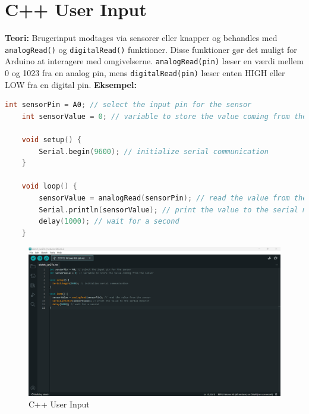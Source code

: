 \section{C++ User Input}
\textbf{Teori:} Brugerinput modtages via sensorer eller knapper og behandles med \texttt{analogRead()} og \texttt{digitalRead()} funktioner. Disse funktioner gør det muligt for Arduino at interagere med omgivelserne. \texttt{analogRead(pin)} læser en værdi mellem 0 og 1023 fra en analog pin, mens \texttt{digitalRead(pin)} læser enten HIGH eller LOW fra en digital pin.
\newline\newline
\noindent\textbf{Eksempel:}
\begin{lstlisting}[language=C++]
	int sensorPin = A0; // select the input pin for the sensor
	int sensorValue = 0; // variable to store the value coming from the sensor
	
	void setup() {
		Serial.begin(9600); // initialize serial communication
	}
	
	void loop() {
		sensorValue = analogRead(sensorPin); // read the value from the sensor
		Serial.println(sensorValue); // print the value to the serial monitor
		delay(1000); // wait for a second
	}
\end{lstlisting}
\clearpage
\begin{figure}[t!]
	\centering
	\includegraphics[width=\textwidth]{fig/fig4.png}
	\caption{C++ User Input}
	\label{fig:4}
\end{figure}
